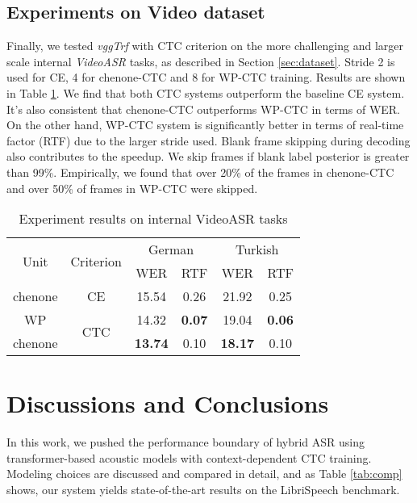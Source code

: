 \documentclass[a4paper]{article}
\begin{document}
\subsection{Experiments on Video dataset}
\vspace{-0.5em}
Finally, we tested \emph{vggTrf} with CTC criterion on the more challenging and larger scale internal \emph{VideoASR} tasks, as described in Section \ref{sec:dataset}. Stride 2 is used for CE, 4 for chenone-CTC and 8 for WP-CTC training. Results are shown in Table \ref{tab:video_asr}. We find that both CTC systems outperform the baseline CE system. It's also consistent that chenone-CTC outperforms WP-CTC in terms of WER. On the other hand, WP-CTC system is significantly better in terms of real-time factor (RTF) due to the larger stride used. Blank frame skipping during decoding also contributes to the speedup. We skip frames if blank label posterior is greater than 99\%. Empirically, we found that over 20\% of the frames in chenone-CTC and over 50\% of frames in WP-CTC were skipped.
\vspace{1em}

\vspace{-1em}
\begin{table}[htb]
    \centering
    \caption{Experiment results on internal VideoASR tasks}
    \begin{tabular}{*6c}
    \hline
    \multirow{2}{*}{Unit} & \multirow{2}{*}{Criterion} & \multicolumn{2}{c}{German}  & \multicolumn{2}{c}{Turkish} \\
     &  & WER & RTF & WER & RTF \\
    \hline\hline
    chenone & CE & 15.54 & 0.26 & 21.92 & 0.25 \\
    WP & \multirow{2}{*}{CTC} & 14.32 & \textbf{0.07} & 19.04 & \textbf{0.06}   \\
    chenone & & \textbf{13.74} & 0.10 & \textbf{18.17} & 0.10  \\
    \hline
    \end{tabular}
    \label{tab:video_asr}
\end{table}
\vspace{-1em}



\section{Discussions and Conclusions}
\label{sec:con}

In this work, we pushed the performance boundary of hybrid ASR using transformer-based acoustic models with context-dependent CTC training. Modeling choices are discussed and compared in detail, and as Table \ref{tab:comp} shows, our system yields state-of-the-art results on the LibriSpeech benchmark.
\end{document}
